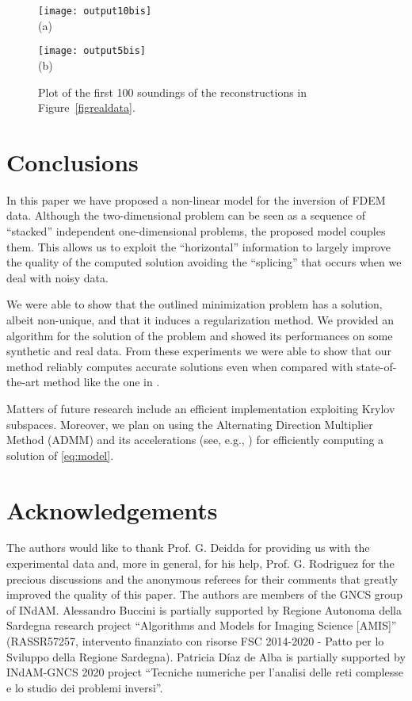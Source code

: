 \documentclass[final,leqno]{siamltex}
\begin{document}
\begin{figure}
\centering
\begin{minipage}{0.45\linewidth}
	\centering
	\texttt{[image: output10bis]}\\(a)
\end{minipage}
\begin{minipage}{0.45\linewidth}
	\centering
	\texttt{[image: output5bis]}\\(b)
\end{minipage}
\caption{Plot of the first 100 soundings of the reconstructions in Figure~\ref{figrealdata}.}
\label{figrealdata2}
\end{figure}

\section{Conclusions}\label{sect:concl}
In this paper we have proposed a non-linear model for the inversion of FDEM data. Although the two-dimensional problem can be seen as a sequence of  ``stacked'' independent one-dimensional problems, the proposed model couples them. This allows us to exploit the ``horizontal'' information to largely improve the quality of the computed solution avoiding the ``splicing'' that occurs when we deal with noisy data.

We were able to show that the outlined minimization problem has a solution, albeit non-unique, and that it induces a regularization method. We provided an algorithm for the solution of the problem and showed its performances on some synthetic and real data. From these experiments we were able to show that our method reliably computes accurate solutions even when compared with state-of-the-art method like the one in \cite{ddrv19}.

Matters of future research include an efficient implementation exploiting Krylov subspaces. Moreover, we plan on using the Alternating Direction Multiplier Method (ADMM) and its accelerations (see, e.g., \cite{boyd,GOSB14,BDD20}) for efficiently computing a solution of \eqref{eq:model}.

\section*{Acknowledgements}
The authors would like to thank Prof. G. Deidda for providing us with the experimental data and, more in general, for his help, Prof. G. Rodriguez for the precious discussions and  the anonymous referees for their comments that greatly improved the quality of this paper. The authors are members of the GNCS group of INdAM. Alessandro Buccini is partially supported by Regione Autonoma della Sardegna research project ``Algorithms and Models for Imaging Science [AMIS]'' (RASSR57257, intervento finanziato con risorse FSC 2014-2020 - Patto per lo Sviluppo della Regione Sardegna).
Patricia D\'iaz de Alba is partially supported by INdAM-GNCS 2020 project ``Tecniche numeriche per l'analisi delle reti complesse e lo studio dei problemi inversi''.



\end{document}
